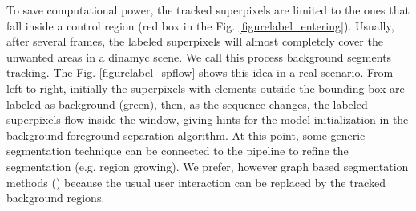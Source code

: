 
To save computational power, the tracked superpixels are 
limited to the ones that fall inside a control region (red box in the Fig.  \ref{figurelabel_entering}). Usually, after several frames, 
the labeled superpixels will almost completely cover the unwanted areas in a dinamyc scene. We call this process background segments tracking.  The Fig. \ref{figurelabel_spflow} shows this idea in a real scenario. From left to right, initially the superpixels with 
elements outside the bounding box are labeled as background (green), then, as the sequence changes, the labeled superpixels flow inside the window, giving hints for the model initialization in the background-foreground separation algorithm. 
At this point, some generic segmentation technique can be connected to the pipeline to refine the segmentation (e.g. region growing). We prefer, however graph based segmentation methods (\cite{c18}\cite{c15}) because the usual user interaction can be replaced by the tracked background regions.


